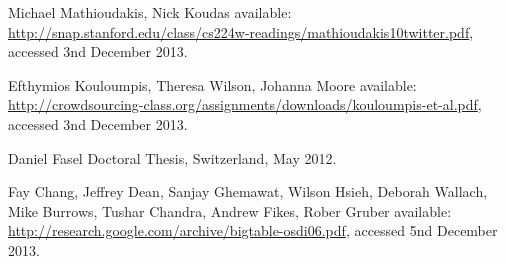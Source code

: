 \documentclass[a4paper]{article}
\begin{document}
\begin{thebibliography}{20}
	Michael Mathioudakis, Nick Koudas
	\newblock available: \url{http://snap.stanford.edu/class/cs224w-readings/mathioudakis10twitter.pdf}, accessed 3nd December 2013.
	
	Efthymios Kouloumpis, Theresa Wilson, Johanna Moore
	\newblock available: \url{http://crowdsourcing-class.org/assignments/downloads/kouloumpis-et-al.pdf}, accessed 3nd December 2013.
	
	Daniel Fasel
	\newblock Doctoral Thesis, Switzerland, May 2012.

	Fay Chang, Jeffrey Dean, Sanjay Ghemawat, Wilson Hsieh, Deborah Wallach, Mike Burrows, Tushar Chandra, Andrew Fikes, Rober Gruber
	\newblock available: \url{http://research.google.com/archive/bigtable-osdi06.pdf}, accessed 5nd December 2013.

	\newblock{}
	\newblock{}
	
\end{thebibliography}
\end{document}
